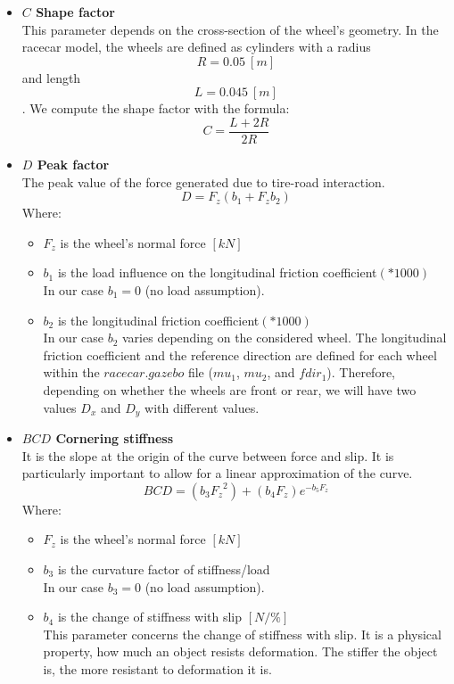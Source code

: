 \begin{itemize}
	\item \textbf{$C$ Shape factor} \\
		  This parameter depends on the cross-section of the wheel's geometry. 
		  In the racecar model, the wheels are defined as cylinders with a radius \[R = 0.05 \ [m]\] and length \[L = 0.045 \ [m]\].
		  We compute the shape factor with the formula: \[ C = \frac{L+2R}{2R}\]
	\item \textbf{$D$ Peak factor} \\
		  The peak value of the force generated due to tire-road interaction.
		  \[ D = F_z(b_1 + F_zb_2)\]
		  Where:
		  \begin{itemize}
		  	\item $F_z$ is the wheel's normal force $[kN]$
		  	\item $b_1$ is the load influence on the longitudinal friction coefficient$(*1000)$ \\
		  	In our case $b_1 = 0$ (no load assumption).
		  	\item $b_2$ is the longitudinal friction coefficient$(*1000)$\\
		  	In our case $b_2$ varies depending on the considered wheel. The longitudinal friction coefficient and the reference direction are defined for each wheel within the $racecar.gazebo$ file ($mu_1$, $mu_2$, and $fdir_1$). Therefore, depending on whether the wheels are front or rear, we will have two values $D_x$ and $D_y$ with different values.
		  \end{itemize}
	  \item \textbf{$BCD$ Cornering stiffness} \\
	  		It is the slope at the origin of the curve between force and slip. It is particularly important to allow for a linear approximation of the curve.
	  		\[BCD = (b_3{F_z}^2) + (b_4F_z){e}^{-b_5F_z}\]
	  		Where:
	  		\begin{itemize}
	  			\item $F_z$ is the wheel's normal force $[kN]$
	  			\item $b_3$ is the curvature factor of stiffness/load \\
	  				  In our case $b_3 = 0$ (no load assumption).
	  			\item $b_4$ is the change of stiffness with slip $[N/\%]$ \\
	  				  This parameter concerns the change of stiffness with slip. It is a physical property, how much an object resists deformation. The stiffer the object is, the more resistant to deformation it is.

\end{itemize}
\end{itemize}
